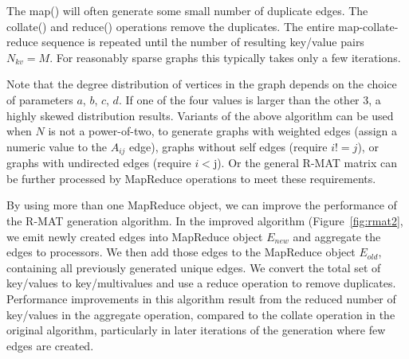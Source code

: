 The map() will often generate some small number of duplicate edges.
The collate() and reduce() operations remove the duplicates.  The
entire map-collate-reduce sequence is repeated until the number of
resulting key/value pairs $N_{kv} = M$.  For reasonably sparse graphs
this typically takes only a few iterations.

Note that the degree distribution of vertices in the graph depends on
the choice of parameters $a$, $b$, $c$, $d$.  If one of the four
values is larger than the other 3, a highly skewed distribution
results.  Variants of the above algorithm can be used when $N$ is not
a power-of-two, to generate graphs with weighted edges (assign a
numeric value to the $A_{ij}$ edge), graphs without self edges
(require $i != j$), or graphs with undirected edges (require $i < $j).
Or the general R-MAT matrix can be further processed by MapReduce
operations to meet these requirements.

By using more than one MapReduce object, we can improve the performance
of the R-MAT generation algorithm.  In the improved algorithm
(Figure~\ref{fig:rmat2}, we emit newly created edges into MapReduce object
$E_{new}$ and aggregate the edges to processors.  We then add those edges
to the MapReduce object $E_{old}$, containing all previously generated
unique edges.  We convert the total set of key/values to key/multivalues
and use a reduce operation to remove duplicates.  Performance improvements
in this algorithm result from the reduced number of key/values in the aggregate
operation, compared to the collate operation in the original algorithm, 
particularly in later iterations of the generation where few
edges are created.


